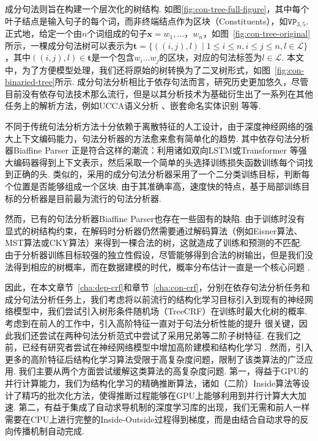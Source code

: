 
成分句法则旨在构建一个层次化的树结构.
如图\ref{fig:con-tree-full-figure}，其中每个叶子结点是输入句子的每个词，而非终端结点作为区块（Constituents），如$\texttt{VP}_{3,5}$.
正式地，给定一个由$n$个词组成的句子$\boldsymbol{x}=w_1,\dots，w_{n}$，如图~\ref{fig:con-tree-original}所示，一棵成分句法树可以表示为$\boldsymbol{t}=\{((i, j),l)\mid 1\le i \le n,i \le j \le n,l \in \mathcal{L}\}$，其中$((i,j),l) \in \boldsymbol{t}$是一个包含$w_{i}...w_{j}$的区块，对应的句法标签为$l \in \mathcal{L}$.
本文中，为了方便模型处理，我们还将原始的树转换为了二叉树形式，如图~\ref{fig:con-binaried-tree}所示.
成分句法分析相比于依存句法而言，研究历史更加悠久，尽管目前没有依存句法技术那么流行，但是以其分析技术为基础衍生出了一系列在其他任务上的解析方法，例如UCCA语义分析 \citep{jiang-etal-2019-hlt}、嵌套命名实体识别 \citep{fu-etal-2021-nested}等等.

不同于传统句法分析方法十分依赖于离散特征的人工设计，由于深度神经网络的强大上下文编码能力，句法分析器的方法愈来愈有简单化的趋势.
其中依存句法分析器Biaffine Parser \citep{dozat-etal-2017-biaffine}正是符合这样的潮流：利用诸如双向LSTM或Transformer \citep{vaswani-2017-attention}等强大编码器得到上下文表示，然后采取一个简单的头选择训练损失函数训练每个词找到正确的头.
类似的，\citet{gaddy-etal-2018-whats}采用的成分句法分析器采用了一个二分类训练目标，判断每个位置是否能够组成一个区块.
由于其准确率高，速度快的特点，基于局部训练目标的分析器是目前最为流行的句法分析器.

然而，已有的句法分析器Biaffine Parser也存在一些固有的缺陷.
由于训练时没有显式的树结构约束，在解码时分析器仍然需要通过解码算法（例如Eisner算法、MST算法或CKY算法）来得到一棵合法的树，这就造成了训练和预测的不匹配.
由于分析器训练目标较强的独立性假设，尽管能够得到合法的树输出，但是我们没法得到相应的树概率，而在数据建模的时代，概率分布估计一直是一个核心问题 \citep{le-zuidema-2014-inside}.

因此，在本文章节~\ref{cha:dep-crf}和章节~\ref{cha:con-crf}，分别在依存句法分析任务和成分句法分析任务上，我们考虑将以前流行的结构化学习目标引入到现有的神经网络模型中，我们尝试引入树形条件随机场（TreeCRF）在训练时最大化树的概率.
考虑到在前人的工作中，引入高阶特征一直对于句法分析性能的提升 \citep{mcdonald-pereira-2006-online,chen-manning-2014-fast}很关键，因此我们还尝试在两种句法分析范式中尝试了采用兄弟等二阶子树特征.
在我们之前，已经有研究者尝试在神经网络模型中增加高阶建模和结构化学习 \citep{zhang-etal-2019-empirical,falenska-kuhn-2019-non}.
然而，引入更多的高阶特征后结构化学习算法受限于高复杂度问题，限制了该类算法的广泛应用.
我们主要从两个方面尝试缓解这类算法的高复杂度问题.
第一，得益于GPU的并行计算能力，我们为结构化学习的精确推断算法，诸如（二阶）Inside算法等设计了精巧的批次化方法，使得推断过程能够在GPU上能够利用到并行计算大大加速.
第二，有益于集成了自动求导机制的深度学习库的出现，我们无需和前人一样需要在CPU上进行完整的Inside-Outside过程得到梯度，而是由结合自动求导的反向传播机制自动完成.

